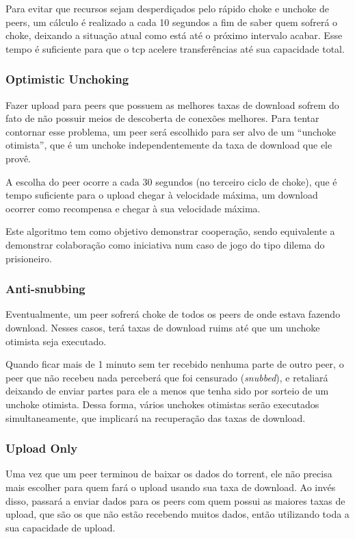 Para evitar que recursos sejam desperdiçados pelo rápido choke e unchoke de
\glspl*{peer}, um cálculo é realizado a cada 10 segundos a fim de saber quem sofrerá o
choke, deixando a situação atual como está até o próximo intervalo acabar. Esse tempo é
suficiente para que o \gls*{tcp} acelere transferências até sua capacidade total.

\subsubsection*{Optimistic Unchoking}

Fazer upload para \glspl*{peer} que possuem as melhores taxas de download sofrem do fato
de não possuir meios de descoberta de conexões melhores. Para tentar contornar esse
problema, um \gls*{peer} será escolhido para ser alvo de um ``unchoke otimista'', que é
um unchoke independentemente da taxa de download que ele provê.

A escolha do \gls*{peer} ocorre a cada 30 segundos (no terceiro ciclo de choke), que é
tempo suficiente para o upload chegar à velocidade máxima, um download ocorrer como
recompensa e chegar à sua velocidade máxima.

Este algoritmo tem como objetivo demonstrar cooperação, sendo equivalente a demonstrar
colaboração como iniciativa num caso de jogo do tipo dilema do prisioneiro.

\subsubsection*{Anti-snubbing}

Eventualmente, um \gls*{peer} sofrerá choke de todos os \glspl*{peer} de onde estava
fazendo download. Nesses casos, terá taxas de download ruims até que um unchoke
otimista seja executado.

Quando ficar mais de 1 minuto sem ter recebido nenhuma parte de outro \gls*{peer}, o
\gls*{peer} que não recebeu nada perceberá que foi censurado (\emph{snubbed}), e
retaliará deixando de enviar partes para ele a menos que tenha sido por sorteio de
um unchoke otimista. Dessa forma, vários unchokes otimistas serão executados
simultaneamente, que implicará na recuperação das taxas de download.

\subsubsection*{Upload Only}

Uma vez que um \gls*{peer} terminou de baixar os dados do \gls*{torrent}, ele não
precisa mais escolher para quem fará o upload usando sua taxa de download. Ao invés
disso, passará a enviar dados para os \glspl*{peer} com quem possui as maiores taxas de
upload, que são os que não estão recebendo muitos dados, então utilizando toda a sua capacidade de upload.


